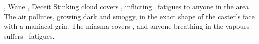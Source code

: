  {\mWater, \mFate}%
  {Wane}%
  {\detailed, \duplicated}%
  {Deceit}%
  {Stinking cloud covers \spellArea, inflicting ~\glspl{fatigue} to anyone in the area}%
  {
    The air pollutes, growing dark and smoggy, in the exact shape of the caster's face with a maniacal grin.
    The miasma covers \spellArea, and anyone breathing in the vapours suffers ~\glspl{fatigue}.
  }

